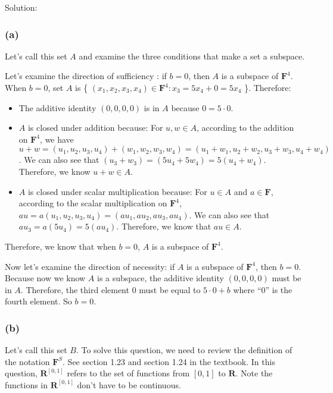 \documentclass[12pt, letterpaper, oneside]{book}
\begin{document}
Solution:

\subsubsection*{(a)}

Let's call this set $A$ and examine the three conditions that make a set a
subspace.

Let's examine the direction of sufficiency : if $b = 0$, then $A$ is a subspace
of $\mathbf{F}^4$. When $b = 0$, set $A$ is \{ $(x_1, x_2, x_3, x_4) \in
  \mathbf{F}^4: x_3 = 5x_4 + 0 = 5x_4$ \}. Therefore:

\begin{itemize}
  \item The additive identity $(0, 0, 0, 0)$ is in $A$ because $0 = 5 \cdot 0$.
  \item $A$ is closed under addition because: For $u, w \in A$, according to
        the addition on $\mathbf{F}^4$, we have $u + w = (u_1, u_2, u_3, u_4) +
          (w_1, w_2, w_3, w_4) = (u_1 + w_1, u_2 + w_2, u_3 + w_3, u_4 + w_4)$. We
        can also see that $(u_3 + w_3) = (5u_4 + 5w_4) = 5(u_4 + w_4)$. Therefore,
        we know $u + w \in A$.
  \item $A$ is closed under scalar multiplication because: For $u \in A$ and $a
          \in \mathbf{F}$, according to the scalar multiplication on $\mathbf{F}^4$,
        $au = a(u_1, u_2, u_3, u_4) = (a u_1, a u_2, a u_3, a u_4)$. We can also
        see that $a u_3 = a (5u_4) = 5(a u_4)$. Therefore, we know that $au \in A$.
\end{itemize}

Therefore, we know that when $b = 0$, $A$ is a subspace of $\mathbf{F}^4$.

Now let's examine the direction of necessity: if $A$ is a subspace of
$\mathbf{F}^4$, then $b = 0$. Because now we know $A$ is a subspace, the
additive identity $(0, 0, 0, 0)$ must be in $A$. Therefore, the third element
$0$ must be equal to $5 \cdot 0 + b$ where ``$0$'' is the fourth element. So
$b = 0$.

\subsubsection*{(b)}

Let's call this set $B$. To solve this question, we need to review the
definition of the notation $\mathbf{F}^S$. See section 1.23 and section 1.24 in
the textbook. In this question, $\mathbf{R}^{[0,1]}$ refers to the set of
functions from $[0,1]$ to $\mathbf{R}$. Note the functions in
$\mathbf{R}^{[0,1]}$ don't have to be continuous.
\end{document}
